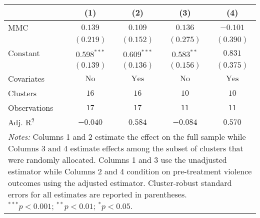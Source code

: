 
\begin{tabular}{l c c c c}
\toprule
 & (1) & (2) & (3) & (4) \\
\midrule
MMC          & $0.139$       & $0.109$        & $0.136$       & $-0.101$       \\
             & $(0.219)$     & $(0.152)$      & $(0.275)$     & $(0.390)$      \\
Constant     & $0.598^{***}$ & $0.609^{***}$  & $0.583^{**}$  & $0.831$        \\
             & $(0.139)$     & $(0.136)$      & $(0.156)$     & $(0.375)$      \\
\midrule
Covariates   & $\textrm{No}$ & $\textrm{Yes}$ & $\textrm{No}$ & $\textrm{Yes}$ \\
Clusters     & $16$          & $16$           & $10$          & $10$           \\
Observations & $17$          & $17$           & $11$          & $11$           \\
Adj. R$^2$   & $-0.040$      & $0.584$        & $-0.084$      & $0.570$        \\
\bottomrule
\multicolumn{5}{l}{\scriptsize{\parbox{.5\linewidth}{\vspace{2pt} 
       \textit{Notes:} Columns 1 and 2 estimate the effect on the full sample while Columns 3 
       and 4 estimate effects among the subset of clusters that were randomly allocated.
       Columns 1 and 3 use the unadjusted estimator while Columns 2 and 4 condition on 
       pre-treatment violence outcomes using the adjusted estimator. Cluster-robust 
       standard errors for all estimates are reported in parentheses. \\ $^{***}p<0.001$; $^{**}p<0.01$; $^{*}p<0.05$.}}}
\end{tabular}
